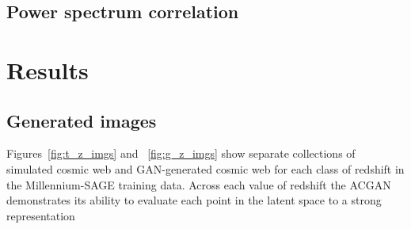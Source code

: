 \documentclass[twocolumn]{article}
\numberwithin{equation}{section}
\begin{document}
\subsection{Power spectrum correlation}



\section{Results}\label{sec:results}



\subsection{Generated images}
Figures~\ref{fig:t_z_imgs} and ~\ref{fig:g_z_imgs} show separate collections of simulated cosmic web and GAN-generated 
cosmic web for each class of redshift in the Millennium-SAGE training data. Across each value of redshift the ACGAN 
demonstrates its ability to evaluate each point in the latent space to a strong representation 
\end{document}
